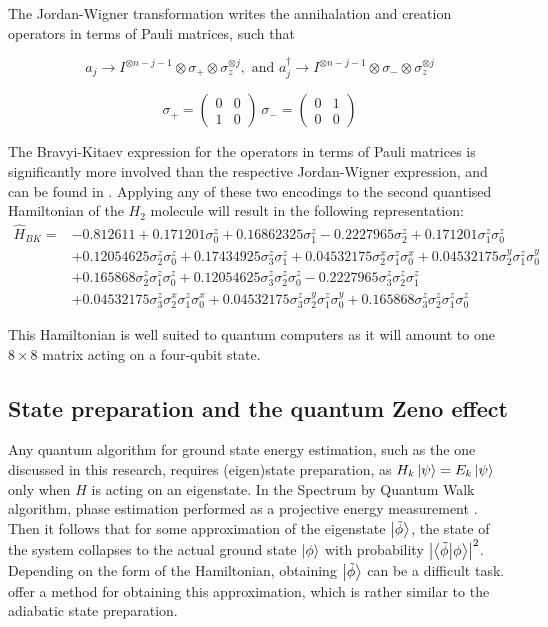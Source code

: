 The Jordan-Wigner transformation writes the annihalation and creation operators in terms of Pauli matrices, such that \cite{daskin}

$$
a_{j} \rightarrow I^{\otimes n-j-1} \otimes \sigma_{+} \otimes \sigma_{z}^{\otimes j}, \text { and } a_{j}^{\dagger} \rightarrow I^{\otimes n-j-1} \otimes \sigma_{-} \otimes \sigma_{z}^{\otimes j}
$$

$$
\sigma_+ = \begin{pmatrix} 0&0\\1&0 \end{pmatrix} \
\sigma_- = \begin{pmatrix} 0&1\\0&0 \end{pmatrix}
$$


The Bravyi-Kitaev expression for the operators in terms of Pauli matrices is significantly more involved than the respective Jordan-Wigner expression, and can be found in \cite{seeley}. Applying any of these two encodings to the second quantised Hamiltonian of the $H_2$ molecule will result in the following representation:
$$
\begin{aligned}
\hat{H}_{B K}=&-0.812611+0.171201 \sigma_{0}^{z}+0.16862325 \sigma_{1}^{z}-0.2227965 \sigma_{2}^{z}+0.171201 \sigma_{1}^{z} \sigma_{0}^{z} \\
&+0.12054625 \sigma_{2}^{z} \sigma_{0}^{z}+0.17434925 \sigma_{3}^{z} \sigma_{1}^{z}+0.04532175 \sigma_{2}^{x} \sigma_{1}^{z} \sigma_{0}^{x}+0.04532175 \sigma_{2}^{y} \sigma_{1}^{z} \sigma_{0}^{y} \\
&+0.165868 \sigma_{2}^{z} \sigma_{1}^{z} \sigma_{0}^{z}+0.12054625 \sigma_{3}^{z} \sigma_{2}^{z} \sigma_{0}^{z}-0.2227965 \sigma_{3}^{z} \sigma_{2}^{z} \sigma_{1}^{z} \\
&+0.04532175 \sigma_{3}^{z} \sigma_{2}^{x} \sigma_{1}^{z} \sigma_{0}^{x}+0.04532175 \sigma_{3}^{z} \sigma_{2}^{y} \sigma_{1}^{z} \sigma_{0}^{y}+0.165868 \sigma_{3}^{z} \sigma_{2}^{z} \sigma_{1}^{z} \sigma_{0}^{z}
\end{aligned}
$$

This Hamiltonian is well suited to quantum computers as it will amount to one $8 \times 8$ matrix acting on a four-qubit state.

\subsection{State preparation and the quantum Zeno effect}


Any quantum algorithm for ground state energy estimation, such as the one discussed in this research, requires (eigen)state preparation, as $H_k \ket{\psi} = E_k \ket{\psi}$ only when $H$ is acting on an eigenstate. In the Spectrum by Quantum Walk algorithm, phase estimation performed as a projective energy measurement \cite{Poulin}. Then it follows that for some approximation of the eigenstate $\ket{\tilde{\phi}}$, the state of the system collapses to the actual ground state $\ket{\phi}$ with probability $\abs{\braket{\tilde{\phi}}{\phi}}^2$. Depending on the form of the Hamiltonian, obtaining $\ket{\tilde{\phi}}$ can be a difficult task. \textcite{poulin} offer a method for obtaining this approximation, which is rather similar to the adiabatic state preparation.

